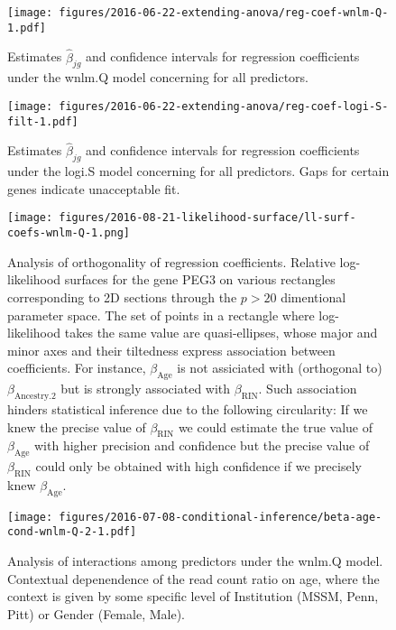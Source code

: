 \documentclass[12pt,letterpaper]{article}
\begin{document}
\begin{figure}[h]
\begin{center}
\texttt{[image: figures/2016-06-22-extending-anova/reg-coef-wnlm-Q-1.pdf]}
\end{center}
\caption{
Estimates \(\hat{\beta}_{jg}\) and confidence intervals for regression
coefficients under the wnlm.Q model concerning for all predictors.
}
\label{fig:all-effects-wnlm.Q}
\end{figure}

\begin{figure}[h]
\begin{center}
\texttt{[image: figures/2016-06-22-extending-anova/reg-coef-logi-S-filt-1.pdf]}
\end{center}
\caption{
Estimates \(\hat{\beta}_{jg}\) and confidence intervals for regression
coefficients under the logi.S model concerning for all predictors.  Gaps
for certain genes indicate unacceptable fit.
}
\label{fig:all-effects-logi.S}
\end{figure}

\begin{figure}[h]
\begin{center}
\texttt{[image: figures/2016-08-21-likelihood-surface/ll-surf-coefs-wnlm-Q-1.png]}
\end{center}
\caption{
Analysis of orthogonality of regression coefficients.  Relative log-likelihood
surfaces for the gene PEG3 on various rectangles corresponding to 2D sections
through the \(p>20\) dimentional parameter space.  The set of points in a
rectangle where log-likelihood takes the same value are quasi-ellipses, whose
major and minor axes and their tiltedness express association between
coefficients.  For instance, \(\beta_\mathrm{Age}\) is not assiciated with
(orthogonal to) \(\beta_\mathrm{Ancestry.2}\) but is strongly associated with
\(\beta_\mathrm{RIN}\).  Such association hinders statistical inference due to
the following circularity: If we knew the precise value of
\(\beta_\mathrm{RIN}\) we could estimate the true value of
\(\beta_\mathrm{Age}\) with higher precision and confidence but the precise
value of \(\beta_\mathrm{RIN}\) could only be obtained with high confidence if
we precisely knew \(\beta_\mathrm{Age}\).
}
\label{fig:ll-non-orthogonality}
\end{figure}

\begin{figure}[h]
\begin{center}
\texttt{[image: figures/2016-07-08-conditional-inference/beta-age-cond-wnlm-Q-2-1.pdf]}
\end{center}
\caption{
Analysis of interactions among predictors under the wnlm.Q model.  Contextual depenendence of the
read count ratio on age, where the context is given by some specific level of
Institution (MSSM, Penn, Pitt) or Gender (Female, Male).
}
\label{fig:interaction-wnlm.Q}
\end{figure}
\end{document}
